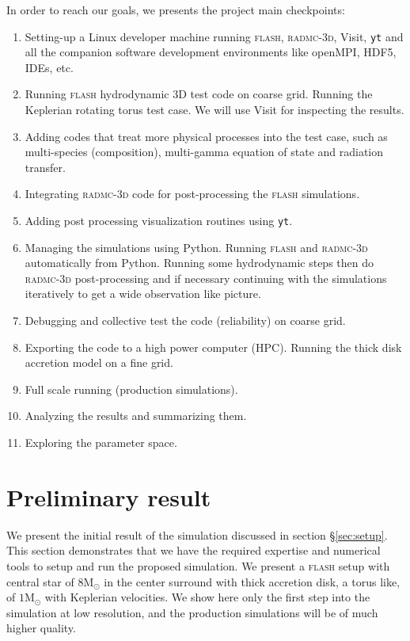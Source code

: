 \documentclass[modern]{aastex62}
\newcommand{\Msun}{\mathrm{M}_\odot}
\newcommand{\flash}[1]{\textsc{flash}#1}
\newcommand{\radmc}[1]{\textsc{radmc-3d}#1}
\newcommand{\yt}[1]{\texttt{yt}#1}
\newcommand{\visit}[1]{Visit#1}
\newcommand{\python}[1]{Python#1}
\begin{document}
In order to reach our goals, we presents the project main checkpoints:
\begin{enumerate}
\item Setting-up a Linux developer machine running \flash{}, \radmc{}, \visit{}, \yt{} and all the companion software development environments like openMPI, HDF5, IDEs, etc.
\item Running \flash{} hydrodynamic 3D test code on coarse grid. Running the Keplerian rotating torus test case. We will use \visit{} for inspecting the results.
\item Adding codes that treat more physical processes into the test case, such as multi-species (composition), multi-gamma equation of state and radiation transfer.
\item Integrating \radmc{} code for post-processing the \flash{} simulations.
\item Adding post processing visualization routines using \yt{}.
\item Managing the simulations using \python{}. Running \flash{} and \hbox{\radmc{}} automatically from \python. Running some hydrodynamic steps then do \radmc{} post-processing and if necessary continuing with the simulations iteratively to get a wide observation like picture.
\item Debugging and collective test the code (reliability) on coarse grid.
\item Exporting the code to a high power computer (HPC). Running the thick disk accretion model on a fine grid.
\item Full scale running (production simulations).
\item Analyzing the results and summarizing them.
\item Exploring the parameter space.
\end{enumerate}


\section{Preliminary result\label{app:preliminarty result}}
We present the initial result of the simulation discussed in section \S\ref{sec:setup}. This section demonstrates that we have the required expertise and numerical tools to setup and run the proposed simulation. We present a \flash{} setup with central star of $8\Msun$ in the center surround with thick accretion disk, a torus like, of $1 \Msun$ with Keplerian velocities. We show here only the first step into the simulation at low resolution, and the production simulations will be of much higher quality.
\end{document}
